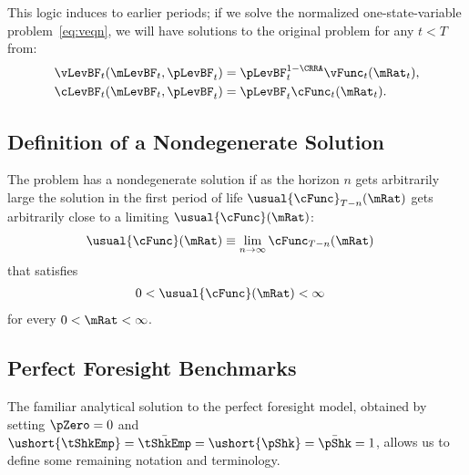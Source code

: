 \documentclass[BufferStockTheory]{subfiles}
\begin{document}
This logic induces to earlier periods; if we solve the
normalized one-state-variable problem~\eqref{eq:veqn}, we
will have solutions to the original problem for any $t<T$
from:
\begin{align*}
  \vLevBF_{t}(\mLevBF_{t},\pLevBF_{t})  & = \pLevBF_{t}^{1-\CRRA}\vFunc_{t}(\mRat_{t}),
  \\ \cLevBF_{t}(\mLevBF_{t},\pLevBF_{t})  & = \pLevBF_{t}\cFunc_{t}(\mRat_{t}).
\end{align*}

\hypertarget{Definition-of-a-Nondegenerate-Solution}{}
\subsection{Definition of a Nondegenerate Solution}

The problem has a nondegenerate solution if as the horizon $n$ gets arbitrarily large the solution in the first period of life $\usual{\cFunc}_{T-n}(\mRat)$ gets arbitrarily close to a limiting $\usual{\cFunc}(\mRat)$:
\begin{align}
  \usual{\cFunc}(\mRat)  & \equiv  \lim_{n \rightarrow \infty} \cFunc_{T-n}(\mRat)
\end{align}
that satisfies
\begin{align}
  0 & < \usual{\cFunc}(\mRat) <  \infty
\end{align}
for every $0 < \mRat < \infty$.%

\hypertarget{Perfect-Foresight-Benchmarks}{}
\subsection{Perfect Foresight Benchmarks}

The familiar analytical solution to the perfect foresight model, obtained by setting $\pZero=0$ and $\ushort{\tShkEmp}=\bar{\tShkEmp}=\ushort{\pShk}=\bar{\pShk}=1$, allows us to define some remaining notation and terminology.

\hypertarget{Human-Wealth}{}
\end{document}

